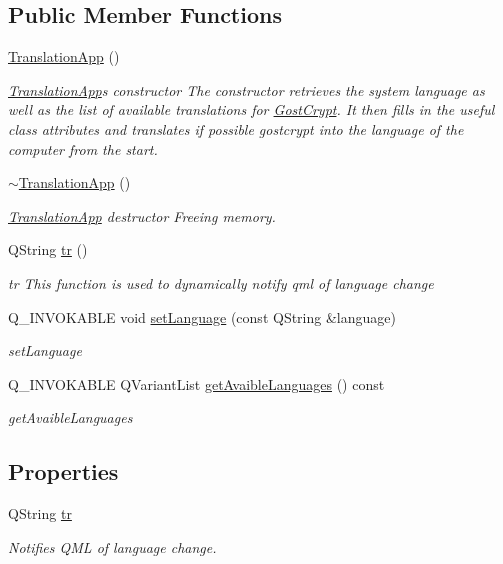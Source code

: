 \subsection*{Public Member Functions}
\begin{DoxyCompactItemize}
\item 
\hyperlink{class_translation_app_af88e0052999d427bfcdaccf28e89ba8a}{Translation\+App} ()
\begin{DoxyCompactList}\small\item\em \hyperlink{class_translation_app}{Translation\+App}\textquotesingle{}s constructor The constructor retrieves the system language as well as the list of available translations for \hyperlink{namespace_gost_crypt}{Gost\+Crypt}. It then fills in the useful class attributes and translates if possible gostcrypt into the language of the computer from the start. \end{DoxyCompactList}\item 
\hyperlink{class_translation_app_addb9ee7608e2de19d535a5d2352e1cc4}{$\sim$\+Translation\+App} ()
\begin{DoxyCompactList}\small\item\em \hyperlink{class_translation_app}{Translation\+App} destructor Freeing memory. \end{DoxyCompactList}\item 
Q\+String \hyperlink{class_translation_app_a71ce718c29f15b4819f0954ae491efb7}{tr} ()
\begin{DoxyCompactList}\small\item\em tr This function is used to dynamically notify qml of language change \end{DoxyCompactList}\item 
Q\+\_\+\+I\+N\+V\+O\+K\+A\+B\+LE void \hyperlink{class_translation_app_a7d19253f523f92c290b31bf8ba363cad}{set\+Language} (const Q\+String \&language)
\begin{DoxyCompactList}\small\item\em set\+Language \end{DoxyCompactList}\item 
Q\+\_\+\+I\+N\+V\+O\+K\+A\+B\+LE Q\+Variant\+List \hyperlink{class_translation_app_a4016e918026a89c3b3182d965e2ca12b}{get\+Avaible\+Languages} () const
\begin{DoxyCompactList}\small\item\em get\+Avaible\+Languages \end{DoxyCompactList}\end{DoxyCompactItemize}
\subsection*{Properties}
\begin{DoxyCompactItemize}
\item 
Q\+String \hyperlink{class_translation_app_a3f99c10dae6f19934211e608bb44ab8b}{tr}
\begin{DoxyCompactList}\small\item\em Notifies Q\+ML of language change. \end{DoxyCompactList}\end{DoxyCompactItemize}



